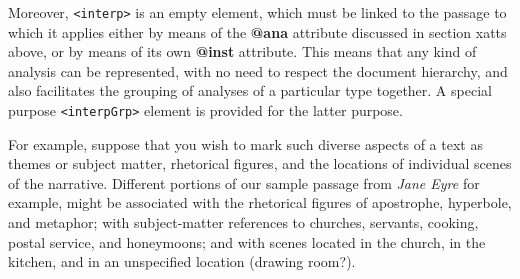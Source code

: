 \documentclass[11pt,twoside]{article}\makeatletter
\begin{document}
Moreover, \texttt{<interp>}  is an empty element, which must be linked to the passage to which it applies either by means of the \textbf{@ana}  attribute discussed in section xatts  above, or by means of its own \textbf{@inst} attribute. This means that any kind of analysis can be represented, with no need to respect the document hierarchy, and also facilitates the grouping of analyses of a particular type together. A special purpose \texttt{<interpGrp>} element is provided for the latter purpose.\par
For example, suppose that you wish to mark such diverse aspects of a text as  themes or subject matter, rhetorical figures, and the locations of individual scenes of the narrative. Different portions of our sample passage from \textit{Jane Eyre} for example, might be associated with the rhetorical figures of apostrophe, hyperbole, and metaphor; with subject-matter references to churches, servants, cooking, postal service, and honeymoons; and with scenes located in the church, in the kitchen, and in an unspecified location (drawing room?).\par
\end{document}
